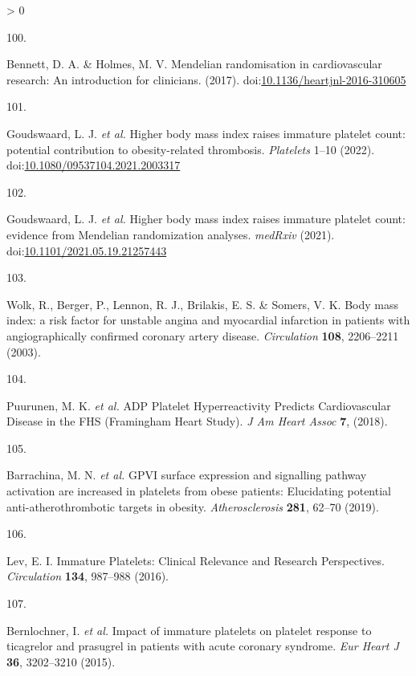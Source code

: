 \documentclass[11pt,twoside]{bristolthesis}
\newlength{\cslhangindent}
\newlength{\csllabelwidth}
\newenvironment{CSLReferences}[2] %
 {%
  \setlength{\parindent}{0pt}
  \ifodd #1 \everypar{\setlength{\hangindent}{\cslhangindent}}\ignorespaces\fi
  \ifnum #2 > 0
  \setlength{\parskip}{#2\baselineskip}
  \fi
 }%
 {}
\newcommand{\CSLLeftMargin}[1]{\parbox[t]{\csllabelwidth}{#1}}
\newcommand{\CSLRightInline}[1]{\parbox[t]{\linewidth - \csllabelwidth}{#1}\break}
\begin{document}
\begin{CSLReferences}{0}{0}
\leavevmode\hypertarget{ref-Bennett2017}{}%
\CSLLeftMargin{100. }
\CSLRightInline{Bennett, D. A. \& Holmes, M. V. {Mendelian randomisation in cardiovascular research: An introduction for clinicians}. (2017). doi:\href{https://doi.org/10.1136/heartjnl-2016-310605}{10.1136/heartjnl-2016-310605}}

\leavevmode\hypertarget{ref-Goudswaard2022}{}%
\CSLLeftMargin{101. }
\CSLRightInline{Goudswaard, L. J. \emph{et al.} {Higher body mass index raises immature platelet count: potential contribution to obesity-related thrombosis}. \emph{Platelets} 1--10 (2022). doi:\href{https://doi.org/10.1080/09537104.2021.2003317}{10.1080/09537104.2021.2003317}}

\leavevmode\hypertarget{ref-Goudswaard2021a}{}%
\CSLLeftMargin{102. }
\CSLRightInline{Goudswaard, L. J. \emph{et al.} {Higher body mass index raises immature platelet count: evidence from Mendelian randomization analyses}. \emph{medRxiv} (2021). doi:\href{https://doi.org/10.1101/2021.05.19.21257443}{10.1101/2021.05.19.21257443}}

\leavevmode\hypertarget{ref-Wolk2003a}{}%
\CSLLeftMargin{103. }
\CSLRightInline{Wolk, R., Berger, P., Lennon, R. J., Brilakis, E. S. \& Somers, V. K. {Body mass index: a risk factor for unstable angina and myocardial infarction in patients with angiographically confirmed coronary artery disease}. \emph{Circulation} \textbf{108}, 2206--2211 (2003).}

\leavevmode\hypertarget{ref-Puurunen2018}{}%
\CSLLeftMargin{104. }
\CSLRightInline{Puurunen, M. K. \emph{et al.} {ADP Platelet Hyperreactivity Predicts Cardiovascular Disease in the FHS (Framingham Heart Study)}. \emph{J Am Heart Assoc} \textbf{7}, (2018).}

\leavevmode\hypertarget{ref-Barrachina2019}{}%
\CSLLeftMargin{105. }
\CSLRightInline{Barrachina, M. N. \emph{et al.} {GPVI surface expression and signalling pathway activation are increased in platelets from obese patients: Elucidating potential anti-atherothrombotic targets in obesity}. \emph{Atherosclerosis} \textbf{281}, 62--70 (2019).}

\leavevmode\hypertarget{ref-Lev2016a}{}%
\CSLLeftMargin{106. }
\CSLRightInline{Lev, E. I. {Immature Platelets: Clinical Relevance and Research Perspectives}. \emph{Circulation} \textbf{134}, 987--988 (2016).}

\leavevmode\hypertarget{ref-Bernlochner2015a}{}%
\CSLLeftMargin{107. }
\CSLRightInline{Bernlochner, I. \emph{et al.} {Impact of immature platelets on platelet response to ticagrelor and prasugrel in patients with acute coronary syndrome}. \emph{Eur Heart J} \textbf{36}, 3202--3210 (2015).}


\end{CSLReferences}
\end{document}
